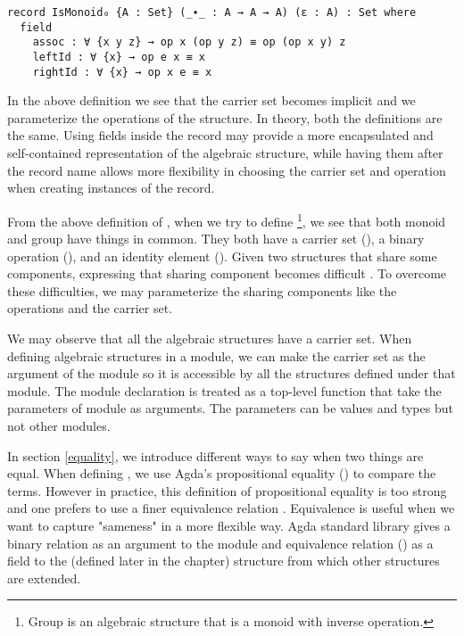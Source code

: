 \begin{verbatim}
record IsMonoid₀ {A : Set} (_∙_ : A → A → A) (ε : A) : Set where
  field
    assoc : ∀ {x y z} → op x (op y z) ≡ op (op x y) z
    leftId : ∀ {x} → op e x ≡ x
    rightId : ∀ {x} → op x e ≡ x 
\end{verbatim}

In the above definition we see that the carrier set  becomes implicit
and we parameterize the operations of the structure. In theory, both the
definitions are the same. Using fields inside the record may provide a more
encapsulated and self-contained representation of the algebraic structure, while
having them after the record name allows more flexibility in choosing the
carrier set and operation when creating instances of the record. 

From the above definition of , when we try to define
\footnote{Group is an algebraic structure that is a monoid with
inverse operation.}, we see that both monoid and group have things in common.
They both have a carrier set (), a binary operation (), and
an identity element (). Given two structures that share some
components, expressing that sharing component becomes difficult \cite{musa}. To
overcome these difficulties, we may parameterize the sharing components like the
operations and the carrier set.

We may observe that all the algebraic structures have a carrier set. When
defining algebraic structures in a module, we can make the carrier set as the
argument of the module so it is accessible by all the structures defined under
that module. The module declaration is treated as a top-level function that take
the parameters of module as arguments. The parameters can be values and types
but not other modules.

In section \ref{equality}, we introduce different ways to say when two things
are equal. When defining , we use Agda's propositional equality
() to compare the terms. However in practice, this definition of
propositional equality is too strong and one prefers to use a finer equivalence
relation \cite{musa}. Equivalence is useful when we want to capture "sameness"
in a more flexible way. Agda standard library gives a binary relation as an
argument to the module and equivalence relation () as a
field to the  (defined later in the chapter) structure from
which other structures are extended.
 
